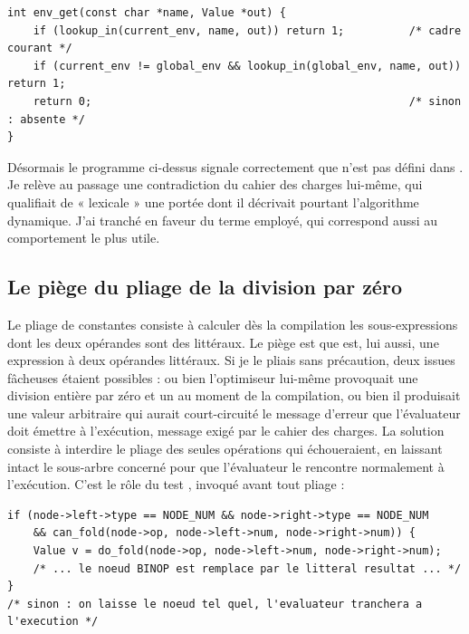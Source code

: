 \begin{lstlisting}[style=c,caption={Résolution lexicale corrigée (extrait de \code{symtab.c}).}]
int env_get(const char *name, Value *out) {
    if (lookup_in(current_env, name, out)) return 1;          /* cadre courant */
    if (current_env != global_env && lookup_in(global_env, name, out)) return 1;
    return 0;                                                 /* sinon : absente */
}
\end{lstlisting}

Désormais le programme ci-dessus signale correctement que  n'est pas
défini dans . Je relève au passage une contradiction du cahier des charges
lui-même, qui qualifiait de « lexicale » une portée dont il décrivait pourtant
l'algorithme dynamique. J'ai tranché en faveur du terme employé, qui correspond
aussi au comportement le plus utile.

\subsection{Le piège du pliage de la division par zéro}

Le pliage de constantes consiste à calculer dès la compilation les
sous-expressions dont les deux opérandes sont des littéraux. Le piège est que
 est, lui aussi, une expression à deux opérandes littéraux. Si je le
pliais sans précaution, deux issues fâcheuses étaient possibles : ou bien
l'optimiseur lui-même provoquait une division entière par zéro et un
 au moment de la compilation, ou bien il produisait une valeur
arbitraire qui aurait court-circuité le message d'erreur que l'évaluateur doit
émettre à l'exécution, message exigé par le cahier des charges. La solution
consiste à interdire le pliage des seules opérations qui échoueraient, en laissant
intact le sous-arbre concerné pour que l'évaluateur le rencontre normalement à
l'exécution. C'est le rôle du test , invoqué avant tout pliage :

\begin{lstlisting}[style=c,caption={Le pliage n'est tenté que si l'opération est sûre (extrait de \code{optim.c}).}]
if (node->left->type == NODE_NUM && node->right->type == NODE_NUM
    && can_fold(node->op, node->left->num, node->right->num)) {
    Value v = do_fold(node->op, node->left->num, node->right->num);
    /* ... le noeud BINOP est remplace par le litteral resultat ... */
}
/* sinon : on laisse le noeud tel quel, l'evaluateur tranchera a l'execution */
\end{lstlisting}

